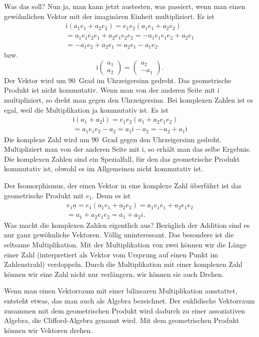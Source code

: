 \documentclass[a4paper,10pt,fleqn,twocolumn,twoside]{article}
\newcommand{\ui}{\mathrm i}
\begin{document}
Was das soll? Nun ja, man kann jetzt austesten, was passiert,
wenn man einen gewöhnlichen Vektor mit der imaginären Einheit
multipliziert. Es ist
\begin{gather*}
\ui(a_1e_1+a_2e_2) = e_1e_2(a_1e_1+a_2e_2)\\
= a_1e_1e_2e_1+a_2e_1e_2e_2 = -a_1e_1e_1e_2+a_2e_1\\
= -a_1e_2+a_2e_1 = a_2e_1-a_1e_2.
\end{gather*}
\noindent
bzw.
\[\ui\begin{pmatrix}a_1\\ a_2\end{pmatrix}
= \begin{pmatrix}a_2\\ -a_1\end{pmatrix}.\]
\noindent
Der Vektor wird um 90~Grad im Uhrzeigersinn gedreht. Das geometrische
Produkt ist nicht kommutativ. Wenn man von der anderen Seite mit $\ui$
multipliziert, so dreht man gegen den Uhrzeigersinn. Bei komplexen
Zahlen ist es egal, weil die Multiplikation ja kommutativ ist. Es ist
\begin{gather*}
\ui(a_1+a_2\ui) = e_1e_2(a_1+a_2e_1e_2)\\
= a_1e_1e_2-a_2 = a_1\ui-a_2 = -a_2+a_1\ui
\end{gather*}
\noindent
Die komplexe Zahl wird um 90~Grad gegen den Uhrzeigersinn gedreht.
Multipliziert man von der anderen Seite mit $\ui$, so erhält man das
selbe Ergebnis. Die komplexen Zahlen sind ein Spezialfall, für den
das geometrische Produkt kommutativ ist, obwohl es im Allgemeinen
nicht kommutativ ist.

Der Isomorphismus, der einen Vektor in eine komplexe Zahl überführt
ist das geometrische Produkt mit $e_1$. Denn es ist
\begin{gather*}
e_1\underline a = e_1(a_1e_1+a_2e_2) = a_1e_1e_1 + a_2e_1e_2\\
= a_1 + a_2e_1e_2 = a_1+a_2i.
\end{gather*}
\noindent
Was macht die komplexen Zahlen eigentlich aus? Bezüglich der Addition
sind es nur ganz gewöhnliche Vektoren. Völlig uninteressant.
Das besondere ist die seltsame Multiplikation. Mit der Multiplikation
von zwei können wir die Länge einer Zahl (interpretiert als Vektor vom
Ursprung auf einen Punkt im Zahlenstrahl) verdoppeln. Durch die Multiplikation
mit einer komplexen Zahl können wir eine Zahl nicht nur verlängern,
wir können sie auch Drehen.

Wenn man einen Vektorraum mit einer bilinearen Multiplikation
ausstattet, entsteht etwas, das man auch als Algebra bezeichnet.
Der euklidische Vektorraum zusammen mit dem geometrischen Produkt
wird dadurch zu einer assoziativen Algebra, die Clifford-Algebra
genannt wird. Mit dem geometrischen Produkt können wir Vektoren
drehen.
\end{document}
